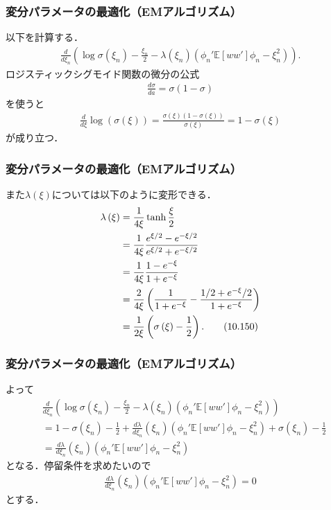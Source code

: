\documentclass[10pt,hyperref={unicode}]{beamer}
\newcommand{\parentheses}[1]{\left(#1\right)}
\newcommand{\brackets}[1]{\left[#1\right]}
\begin{document}
\begin{frame}
\frametitle{変分パラメータの最適化（EMアルゴリズム）}
以下を計算する．
\begin{align*}
    \frac{d}{d\xi_n}\parentheses{\log \sigma\parentheses{\xi_n} - \frac{\xi_n}{2} - \lambda\parentheses{\xi_n}
            \parentheses{\phi_n'\mathbb{E}\brackets{ww'}\phi_n - \xi_n^2}}.
\end{align*}
ロジスティックシグモイド関数の微分の公式
\begin{align}
    \frac{d\sigma}{da} = \sigma\parentheses{1 - \sigma} \tag{4.88}
\end{align}
を使うと
\begin{align*}
    \frac{d}{d\xi}\log \parentheses{\sigma\parentheses{\xi}}
    = \frac{\sigma\parentheses{\xi}\parentheses{1 - \sigma\parentheses{\xi}}}{\sigma\parentheses{\xi}}
    = 1 - \sigma\parentheses{\xi}
\end{align*}
が成り立つ．
\end{frame}

\begin{frame}
\frametitle{変分パラメータの最適化（EMアルゴリズム）}
また$\lambda\parentheses{\xi}$については以下のように変形できる．
\begin{align}
    \lambda\parentheses{\xi} &= \frac{1}{4\xi} \tanh \frac{\xi}{2} \notag \\
                             &= \frac{1}{4\xi} \frac{e^{\xi/2} - e^{-\xi/2}}{e^{\xi/2} + e^{-\xi/2}} \notag \\
                             &= \frac{1}{4\xi} \frac{1 - e^{-\xi}}{1 + e^{-\xi}} \notag \\
                             &= \frac{2}{4\xi} \parentheses{\frac{1}{1 + e^{-\xi}} - \frac{1/2 + e^{-\xi}/2}{1 + e^{-\xi}}} \notag \\
                             &= \frac{1}{2\xi} \parentheses{\sigma\parentheses{\xi} - \frac{1}{2}}. \tag{10.150}
\end{align}
\end{frame}

\begin{frame}
\frametitle{変分パラメータの最適化（EMアルゴリズム）}
よって
\begin{align*}
    &\frac{d}{d\xi_n}\parentheses{\log \sigma\parentheses{\xi_n} - \frac{\xi_n}{2} - \lambda\parentheses{\xi_n}
        \parentheses{\phi_n'\mathbb{E}\brackets{ww'}\phi_n - \xi_n^2}} \\
    &= 1 - \sigma\parentheses{\xi_n} - \frac{1}{2} + \frac{d\lambda}{d\xi_n}\parentheses{\xi_n}\parentheses{\phi_n'\mathbb{E}\brackets{ww'}\phi_n - \xi_n^2}
        + \sigma\parentheses{\xi_n} - \frac{1}{2} \\
    &= \frac{d\lambda}{d\xi_n}\parentheses{\xi_n}\parentheses{\phi_n'\mathbb{E}\brackets{ww'}\phi_n - \xi_n^2}
\end{align*}
となる．停留条件を求めたいので
\begin{align}
    \frac{d\lambda}{d\xi_n}\parentheses{\xi_n}\parentheses{\phi_n'\mathbb{E}\brackets{ww'}\phi_n - \xi_n^2} = 0 \tag{10.162}
\end{align}
とする．
\end{frame}
\end{document}
